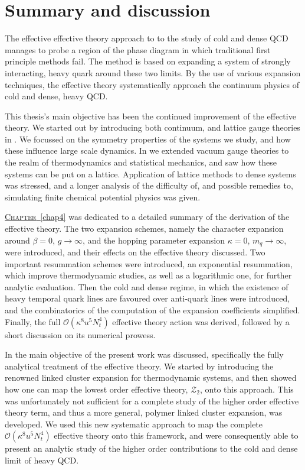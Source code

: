 \chapter{Summary and discussion}

The effective effective theory approach to to the study of cold and dense QCD
manages to probe a region of the phase diagram in which traditional first
principle methods fail. The method is based on expanding a system of strongly
interacting, heavy quark around these two limits. By the use of various
expansion techniques, the effective theory systematically approach the continuum
physics of cold and dense, heavy QCD.

This thesis's main objective has been the continued improvement of the effective
theory. We started out by introducing both continuum, and lattice gauge theories
in . We focussed on the symmetry properties of the systems we
study, and how these influence large scale dynamics. In  we
extended vacuum gauge theories to the realm of thermodynamics and statistical
mechanics, and saw how these systems can be put on a lattice.  Application of
lattice methods to dense systems was stressed, and a longer analysis of the
difficulty of, and possible remedies to, simulating finite chemical potential
physics was given.

\hyperref[chap4]{\mbox{\textsc{Chapter} \ref*{chap4}}} was dedicated to a
detailed summary of the derivation of the effective theory. The two expansion
schemes, namely the character expansion around $\beta = 0$, $g \to \infty$, and
the hopping parameter expansion $\kappa = 0$, $m_q \to \infty$, were introduced,
and their effects on the effective theory discussed. Two important resummation
schemes were introduced, an exponential resummation, which improve thermodynamic
studies, as well as a logarithmic one, for further analytic evaluation. Then the
cold and dense regime, in which the existence of heavy temporal quark lines are
favoured over anti-quark lines were introduced, and the combinatorics of the
computation of the expansion coefficients simplified. Finally, the full
$\mathcal{O}(\kappa^8 u^5 N_t^4)$ effective theory action was derived, followed
by a short discussion on its numerical prowess.

In  the main objective of the present work was discussed,
specifically the fully analytical treatment of the effective theory. We started
by introducing the renowned linked cluster expansion for thermodynamic systems,
and then showed how one can map the lowest order effective theory,
$\mathcal{Z}_2$, onto this approach. This was unfortunately not sufficient for a
complete study of the higher order effective theory term, and thus a more
general, polymer linked cluster expansion, was developed. We used this new
systematic approach to map the complete $\mathcal{O}(\kappa^8 u^5 N_t^4)$
effective theory onto this framework, and were consequently able to present an
analytic study of the higher order contributions to the cold and dense limit of
heavy QCD.


